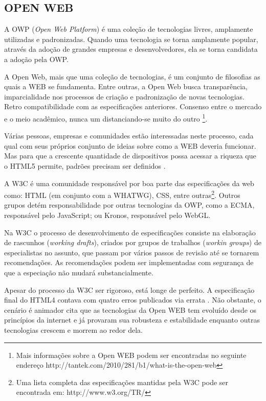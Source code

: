\subsection{OPEN WEB}

A OWP (\textit{Open Web Platform}) é uma coleção de tecnologias
livres, amplamente utilizadas e padronizadas. Quando uma tecnologia
se torna amplamente popular, através da adoção de grandes empresas
e desenvolvedores, ela se torna candidata a adoção pela OWP.

A Open Web, mais que uma coleção de tecnologias, é um conjunto
de filosofias as quais a WEB se fundamenta. Entre outras, a Open
Web busca transparência, imparcialidade nos processos de criação
e padronização de novas tecnologias. Retro compatibilidade com
as especificações anteriores. Consenso entre o mercado e o meio
acadêmico, nunca um distanciando-se muito do outro \footnote{Mais
informações sobre a Open WEB podem ser encontradas no seguinte
endereço http://tantek.com/2010/281/b1/what-is-the-open-web}.

Várias pessoas, empresas e comunidades estão interessadas neste
processo, cada qual com seus próprios conjunto de ideias sobre como
a WEB deveria funcionar. Mas para que a crescente quantidade de
dispositivos possa acessar a riqueza que o HTML5 permite, padrões
precisam ser definidos \autocite[pp. 5]{aSeriousContender}.

A W3C é uma comunidade responsável por boa parte das
especificações da web como: HTML (em conjunto com a WHATWG), CSS,
entre outras\footnote{Uma lista completa das especificações mantidas pela
W3C pode ser encontrada em: http://www.w3.org/TR/}. Outros grupos
detém responsabilidade por outras tecnologias da OWP, como a ECMA,
responsável pelo JavaScript; ou Kronos, responsável pelo WebGL.

Na W3C o processo de desenvolvimento de especificações consiste
na elaboração de rascunhos (\textit{working drafts}), criados por grupos
de trabalhos (\textit{workin groups}) de especialistas no
assunto, que passam por vários passos de revisão até se tornarem
recomendações. As recomendações podem ser implementadas com
segurança de que a especiação não mudará substancialmente.

Apesar do processo da W3C ser rigoroso, está longe de perfeito. A
especificação final do HTML4 contava com quatro erros publicados
via errata \autocite{HTML5}. Não obstante, o cenário é animador
\autocite{html5mostwanted} cita que as tecnologias da Open WEB tem
evoluído desde os princípios da internet e já provaram sua robusteza
e estabilidade enquanto outras tecnologias crescem e morrem ao redor
dela.

